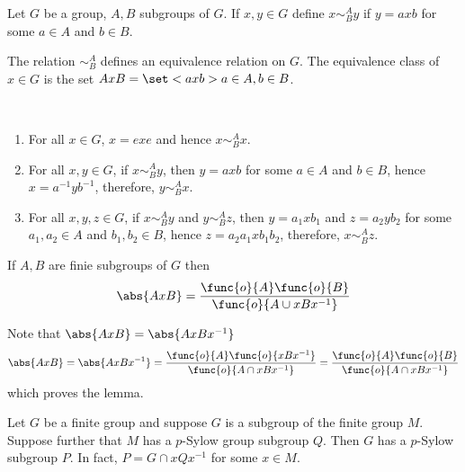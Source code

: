 \begin{definition}
    Let \(G\) be a group, \(A,B\) subgroups of \(G\). If \(x,y \in G\) define \(x \sim^A_B y\) if \(y = axb\) for some \(a \in A\) and \(b \in B\). 
\end{definition}

\begin{lemma}
    The relation \( \sim^A_B \) defines an equivalence relation on \(G\). The equivalence class of \(x \in G\) is the set \(AxB = \set<axb>{a \in A, b \in B}\).
\end{lemma}

\begin{prooflemma}
    \
    \begin{enumerate}
        \item For all \(x \in G\), \(x = exe\) and hence \(x \sim_B^A x\).
        \item For all \(x,y \in G\), if \(x \sim^A_B y\), then \(y = axb\) for some \(a \in A\) and \(b \in B\), hence \(x = a^{-1}y b^{-1}\), therefore, \(y \sim^A_B x\).
        \item For all \(x,y,z \in G\), if \(x \sim^A_B y\) and \(y \sim^A_B z\), then \(y = a_1xb_1\) and \(z = a_2yb_2\) for some \(a_1,a_2 \in A\) and \(b_1,b_2 \in B\), hence \(z = a_2a_1 x b_1b_2\), therefore, \(x \sim^A_B z\).
    \end{enumerate}

\end{prooflemma}

\begin{lemma}
    If \(A,B\) are finie subgroups of \(G\) then 
    \begin{equation*}
        \abs{AxB} = \dfrac{\func{o}{A} \func{o}{B}}{\func{o}{A \cup xBx^{-1}}}
    \end{equation*}
\end{lemma}

\begin{prooflemma}
    Note that \(\abs{AxB} = \abs{AxBx^{-1}}\)
    \begin{equation*}
        \abs{AxB} = \abs{AxBx^{-1}} = \dfrac{\func{o}{A} \func{o}{xBx^{-1}}}{\func{o}{A \cap xBx^{-1}}} =  \dfrac{\func{o}{A} \func{o}{B}}{\func{o}{A \cap xBx^{-1}}}
    \end{equation*}
    which proves the lemma.
\end{prooflemma}

\begin{lemma}
    Let \(G\) be a finite group and suppose \(G\) is a subgroup of the finite group \(M\). Suppose further that \(M\) has a \(p\)-Sylow group subgroup \(Q\). Then \(G\) has a \(p\)-Sylow subgroup \(P\). In fact, \(P = G \cap xQx^{-1}\) for some \(x \in M\).
\end{lemma}

